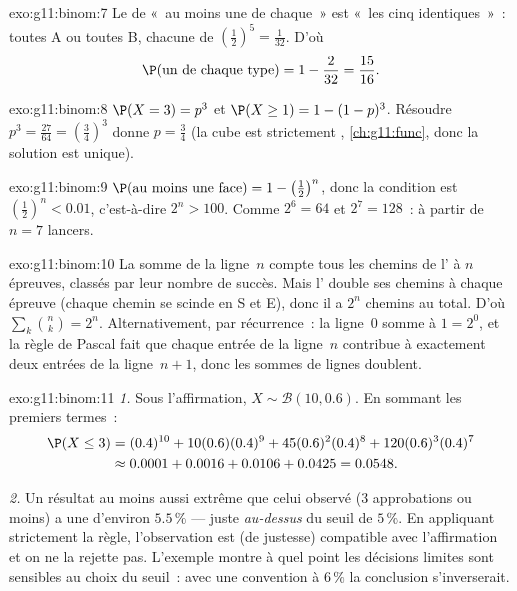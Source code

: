 \begin{solution}{exo:g11:binom:7}
Le  de «~au moins une de chaque~» est «~les cinq
identiques~»~: toutes A ou toutes B, chacune de 
$\left(\frac12\right)^5 = \frac1{32}$. D'où
\[
\P(\text{un de chaque type}) = 1 - \frac{2}{32} = \frac{15}{16} .
\]
\end{solution}

\begin{solution}{exo:g11:binom:8}
$\P(X = 3) = p^3$ et $\P(X \geq 1) = 1 - (1-p)^3$. Résoudre
$p^3 = \frac{27}{64} = \left(\frac34\right)^3$ donne $p = \frac34$ (la
 cube est strictement , \cref{ch:g11:func}, donc la
solution est unique).
\end{solution}

\begin{solution}{exo:g11:binom:9}
$\P(\text{au moins une face}) = 1 - \left(\frac12\right)^n$, donc la
condition est $\left(\frac12\right)^n < 0.01$, c'est-à-dire
$2^n > 100$. Comme $2^6 = 64$ et $2^7 = 128$~: à partir de $n = 7$
lancers.
\end{solution}

\begin{solution}{exo:g11:binom:10}
La somme de la ligne~$n$ compte tous les chemins de l' à $n$
épreuves, classés par leur nombre de succès. Mais l' double ses
chemins à chaque épreuve (chaque chemin se scinde en S et E), donc il a
$2^n$ chemins au total. D'où $\sum_{k} \binom nk = 2^n$.
Alternativement, par récurrence~: la ligne~$0$ somme à $1 = 2^0$, et la
règle de Pascal fait que chaque entrée de la ligne~$n$ contribue à
exactement deux entrées de la ligne~$n+1$, donc les sommes de lignes
doublent.
\end{solution}

\begin{solution}{exo:g11:binom:11}
\emph{1.} Sous l'affirmation, $X \sim \mathcal B(10, 0.6)$. En sommant
les premiers termes~:
\begin{align*}
\P(X \leq 3)
&= (0.4)^{10} + 10(0.6)(0.4)^9 + 45(0.6)^2(0.4)^8
+ 120(0.6)^3(0.4)^7\\
&\approx 0.0001 + 0.0016 + 0.0106 + 0.0425 = 0.0548 .
\end{align*}

\emph{2.} Un résultat au moins aussi extrême que celui observé ($3$
approbations ou moins) a une  d'environ $5.5\,\%$ --- juste
\emph{au-dessus} du seuil de $5\,\%$. En appliquant strictement la règle,
l'observation est (de justesse) compatible avec l'affirmation et on ne
la rejette pas. L'exemple montre à quel point les décisions limites sont
sensibles au choix du seuil~: avec une convention à $6\,\%$ la
conclusion s'inverserait.
\end{solution}

